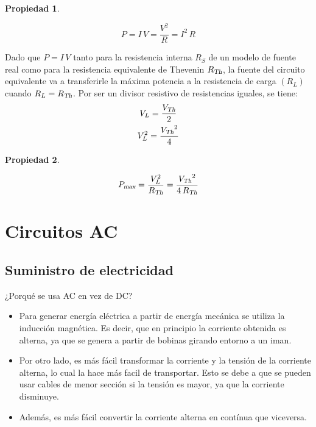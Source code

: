 \documentclass[a5paper,12pt,twoside]{book}
\newtheorem{prop}{{Propiedad}}[chapter]
\begin{document}
\begin{mdframed}[style=MyFrame1]
    \begin{prop}
    \end{prop}
    \begin{equation*}
        P = I \, V = \frac{V^2}{R} = I^2 \, R
    \end{equation*}
\end{mdframed}

Dado que $P = I \, V$ tanto para la resistencia interna $R_S$ de un modelo de fuente real como para la resistencia equivalente de Thevenin ${{R}_\textsl{{Th}}}$, la fuente del circuito equivalente va a transferirle la máxima potencia a la resistencia de carga $(R_L)$ cuando $R_L={{R}_\textsl{{Th}}}$. Por ser un divisor resistivo de resistencias iguales, se tiene:
\begin{gather*}
    V_L = \frac{{{V}_\textsl{{Th}}}}{2}
    \\
    V_L^2 = \frac{{{V}_\textsl{{Th}}}^2}{4}
\end{gather*}

\begin{mdframed}[style=MyFrame1]
    \begin{prop}
    \end{prop}
    \begin{equation*}
        {{P}_\textsl{{max}}} = \frac{V_L^2}{{{R}_\textsl{{Th}}}} = \frac{{{V}_\textsl{{Th}}}^2}{4 \, {{R}_\textsl{{Th}}}}
    \end{equation*}
\end{mdframed}


\chapter{Circuitos AC}


\section{Suministro de electricidad}

¿Porqué se usa AC en vez de DC?

\begin{itemize}
\item Para generar energía eléctrica a partir de energía mecánica se utiliza la inducción magnética. Es decir, que en principio la corriente obtenida es alterna, ya que se genera a partir de bobinas girando entorno a un iman.

\item Por otro lado, es más fácil transformar la corriente y la tensión de la corriente alterna, lo cual la hace más facil de transportar. Esto se debe a que se pueden usar cables de menor sección si la tensión es mayor, ya que la corriente disminuye.

\item Además, es más fácil convertir la corriente alterna en contínua que viceversa.
\end{itemize}
\end{document}
